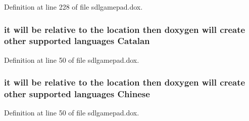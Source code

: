 Definition at line 228 of file sdlgamepad.\-dox.

\hypertarget{sdlgamepad_8dox_ab887b26d09c2ec0872c1e14e2f928a64}{
\subsubsection[{Catalan}]{\setlength{\rightskip}{0pt plus 5cm}it will be relative to the {\bf location} then doxygen will create other supported languages Catalan}}\label{sdlgamepad_8dox_ab887b26d09c2ec0872c1e14e2f928a64}


Definition at line 50 of file sdlgamepad.\-dox.

\hypertarget{sdlgamepad_8dox_ab6ff97d2e5e9fa61c208d5f0eee91c62}{
\subsubsection[{Chinese}]{\setlength{\rightskip}{0pt plus 5cm}it will be relative to the {\bf location} then doxygen will create other supported languages Chinese}}\label{sdlgamepad_8dox_ab6ff97d2e5e9fa61c208d5f0eee91c62}


Definition at line 50 of file sdlgamepad.\-dox.

